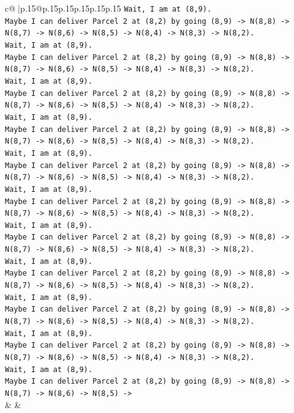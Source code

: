 \documentclass{article}
\begin{document}
{\begin{supertabular}{c@{$\;$}|p{.15\linewidth}@{}p{.15\linewidth}p{.15\linewidth}p{.15\linewidth}p{.15\linewidth}p{.15\linewidth}}
{{{\texttt{Wait, I am at (8,9).} \\
\texttt{Maybe I can deliver Parcel 2 at (8,2) by going (8,9) {-}> N(8,8) {-}> N(8,7) {-}> N(8,6) {-}> N(8,5) {-}> N(8,4) {-}> N(8,3) {-}> N(8,2).} \\
\texttt{Wait, I am at (8,9).} \\
\texttt{Maybe I can deliver Parcel 2 at (8,2) by going (8,9) {-}> N(8,8) {-}> N(8,7) {-}> N(8,6) {-}> N(8,5) {-}> N(8,4) {-}> N(8,3) {-}> N(8,2).} \\
\texttt{Wait, I am at (8,9).} \\
\texttt{Maybe I can deliver Parcel 2 at (8,2) by going (8,9) {-}> N(8,8) {-}> N(8,7) {-}> N(8,6) {-}> N(8,5) {-}> N(8,4) {-}> N(8,3) {-}> N(8,2).} \\
\texttt{Wait, I am at (8,9).} \\
\texttt{Maybe I can deliver Parcel 2 at (8,2) by going (8,9) {-}> N(8,8) {-}> N(8,7) {-}> N(8,6) {-}> N(8,5) {-}> N(8,4) {-}> N(8,3) {-}> N(8,2).} \\
\texttt{Wait, I am at (8,9).} \\
\texttt{Maybe I can deliver Parcel 2 at (8,2) by going (8,9) {-}> N(8,8) {-}> N(8,7) {-}> N(8,6) {-}> N(8,5) {-}> N(8,4) {-}> N(8,3) {-}> N(8,2).} \\
\texttt{Wait, I am at (8,9).} \\
\texttt{Maybe I can deliver Parcel 2 at (8,2) by going (8,9) {-}> N(8,8) {-}> N(8,7) {-}> N(8,6) {-}> N(8,5) {-}> N(8,4) {-}> N(8,3) {-}> N(8,2).} \\
\texttt{Wait, I am at (8,9).} \\
\texttt{Maybe I can deliver Parcel 2 at (8,2) by going (8,9) {-}> N(8,8) {-}> N(8,7) {-}> N(8,6) {-}> N(8,5) {-}> N(8,4) {-}> N(8,3) {-}> N(8,2).} \\
\texttt{Wait, I am at (8,9).} \\
\texttt{Maybe I can deliver Parcel 2 at (8,2) by going (8,9) {-}> N(8,8) {-}> N(8,7) {-}> N(8,6) {-}> N(8,5) {-}> N(8,4) {-}> N(8,3) {-}> N(8,2).} \\
\texttt{Wait, I am at (8,9).} \\
\texttt{Maybe I can deliver Parcel 2 at (8,2) by going (8,9) {-}> N(8,8) {-}> N(8,7) {-}> N(8,6) {-}> N(8,5) {-}> N(8,4) {-}> N(8,3) {-}> N(8,2).} \\
\texttt{Wait, I am at (8,9).} \\
\texttt{Maybe I can deliver Parcel 2 at (8,2) by going (8,9) {-}> N(8,8) {-}> N(8,7) {-}> N(8,6) {-}> N(8,5) {-}> N(8,4) {-}> N(8,3) {-}> N(8,2).} \\
\texttt{Wait, I am at (8,9).} \\
\texttt{Maybe I can deliver Parcel 2 at (8,2) by going (8,9) {-}> N(8,8) {-}> N(8,7) {-}> N(8,6) {-}> N(8,5) {-}>} \\
            }
        }
    }
    & & \\ \\


\end{supertabular}}
\end{document}
